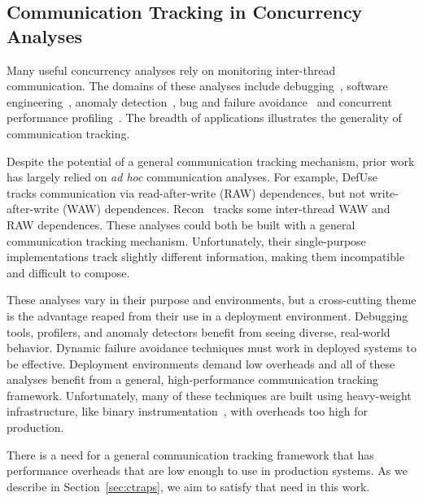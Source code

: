 \documentclass[preprint,9pt]{sigplanconf}
\begin{document}
\subsection{Communication Tracking in Concurrency Analyses}
\label{sec:background:comm}

Many useful concurrency analyses rely on monitoring inter-thread
communication.  The domains of these analyses include 
debugging~\cite{defuse,conseq,recon,bugaboo,raceslicing,fasttrack,falcon},
software engineering~\cite{oshajava,oshatr}, anomaly
detection~\cite{avio,dmtracker,cci,daikon}, bug and failure
avoidance~\cite{aviso,cfix} and concurrent performance
profiling~\cite{threadcriticality,schedpredictionmodel}.  The breadth of
applications illustrates the generality of communication tracking.

Despite the potential of a general communication tracking mechanism, prior work
has largely relied on {\em ad hoc} communication analyses.  For example,
DefUse~\cite{defuse} tracks communication via read-after-write (RAW)
dependences, but not write-after-write (WAW) dependences.  Recon~\cite{recon}
tracks some inter-thread WAW and RAW dependences.  These analyses could both be
built with a general communication tracking mechanism.  Unfortunately, their
single-purpose implementations track slightly different information, making
them incompatible and difficult to compose.

These analyses vary in their purpose and environments, but a cross-cutting
theme is the advantage reaped from their use in a deployment environment.
Debugging tools, profilers, and anomaly detectors benefit from seeing diverse,
real-world behavior.  Dynamic failure avoidance techniques must work in
deployed systems to be effective.  Deployment environments demand low overheads
and all of these analyses benefit from a general, high-performance
communication tracking framework.  Unfortunately, many of these techniques are built using heavy-weight infrastructure, like binary instrumentation~\cite{pin}, with overheads too high for production.  

There is a need for a general communication tracking framework that has
performance overheads that are low enough to use in production systems.  As we
describe in Section~\ref{sec:ctraps}, we aim to satisfy that need in this work.



\end{document}
